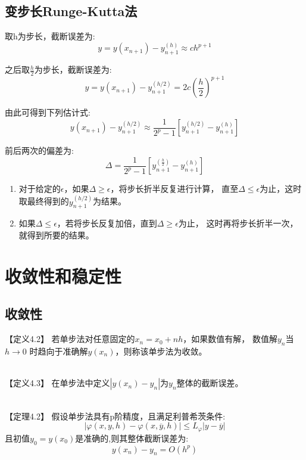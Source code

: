 \documentclass[12pt]{report}
\begin{document}
\subsection{变步长Runge-Kutta法}

取h为步长，截断误差为:
\[
	y = y(x_{n+1}) - y_{n+1}^{(h)} \approx ch^{p+1}
\]

之后取$\frac{h}{2}$为步长，截断误差为:
\[
	y = y(x_{n+1}) - y_{n+1}^{(h/2)}  = 2c(\frac{h}{2})^{p+1}
\]

由此可得到下列估计式:
\[
	y(x_{n+1}) - y_{n+1}^{(h/2)} \approx \frac{1}{2^p - 1}\left[y_{n+1}^{(h/2)} - y_{n+1}^{(h)}\right]
\]

前后两次的偏差为:
\[
	\Delta = \frac{1}{2^p - 1}\left[y_{n+1}^{(\frac{h}{2})} - y_{n+1}^{(h)}\right]
\]

\begin{enumerate}
	\item 对于给定的$\epsilon$，如果$\Delta \ge \epsilon$，将步长折半反复进行计算，
	直至$\Delta \le \epsilon$为止，这时取最终得到的$y_{n+1}^{(h/2)}$为结果。
	\item 如果$\Delta \le \epsilon$，若将步长反复加倍，直到$\Delta \ge \epsilon$为止，
	这时再将步长折半一次，就得到所要的结果。
\end{enumerate}


\section{收敛性和稳定性}

\subsection{收敛性}

【定义4.2】 \quad 若单步法对任意固定的$x_n = x_0 + nh$，如果数值有解，
数值解$y_n$当$h \to 0$ 时趋向于准确解$y(x_n)$，则称该单步法为收敛。 

~\\

【定义4.3】 \quad 在单步法中定义$|y(x_n) - y_n|$为$y_n$整体的截断误差。

~\\

【定理4.2】 \quad 假设单步法具有p阶精度，且满足利普希茨条件:
\[
	|\varphi(x, y, h) - \varphi(x, \overline{y}, h)| \leq L_\varphi |y - \overline{y}|
\]
且初值$y_0 = y(x_0)$是准确的,则其整体截断误差为:
\begin{equation}
	y(x_n) - y_n = O(h^p)
	\tag{4.4} \label{4.4}
\end{equation}
\end{document}
